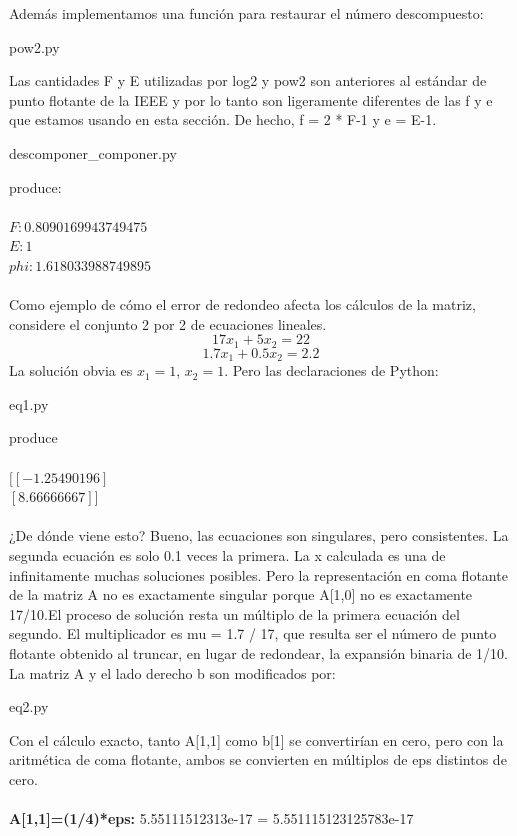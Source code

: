 \documentclass[12pt]{article}
\begin{document}
Adem\'as implementamos una funci\'on para restaurar el n\'umero descompuesto:
\begin{center}

{pow2.py}
\end{center}
Las cantidades F y E utilizadas por log2 y pow2 son anteriores al estándar de punto flotante de la IEEE y por lo tanto son ligeramente diferentes de las f y e que estamos usando en esta
sección. De hecho, f = 2 * F-1 y e = E-1.
\begin{center}

{descomponer_componer.py}
\end{center}
produce:\\\\
$F: 0.8090169943749475$\\
$E: 1$\\
$phi: 1.618033988749895$\\\\
Como ejemplo de cómo el error de redondeo afecta los cálculos de la matriz, considere el
conjunto 2 por 2 de ecuaciones lineales.
$$17x_1+5x_2=22$$
$$1.7x_1+0.5x_2=2.2$$
La solución obvia es $x_1 = 1$, $x_2 = 1$. Pero las declaraciones de Python:
\begin{center}

{eq1.py}
\end{center}
produce\\\\
$[[-1.25490196]$\\
$[8.66666667]]$\\\\
¿De dónde viene esto? Bueno, las ecuaciones son singulares, pero consistentes. La
segunda ecuación es solo 0.1 veces la primera. La x calculada es una de infinitamente
muchas soluciones posibles. Pero la representación en coma flotante de la matriz A no es
exactamente singular porque A[1,0] no es exactamente 17/10.El proceso de solución resta un múltiplo de la primera ecuación del segundo. El multiplicador
es mu = 1.7 / 17, que resulta ser el número de punto flotante obtenido al truncar, en lugar de
redondear, la expansión binaria de 1/10. La matriz A y el lado derecho b son modificados por:
\begin{center}

{eq2.py}
\end{center}
Con el cálculo exacto, tanto A[1,1] como b[1] se convertirían en cero, pero con la aritmética
de coma flotante, ambos se convierten en múltiplos de eps distintos de cero.\\\\
\textbf{A[1,1]=(1/4)*eps:} 5.55111512313e-17 = 5.551115123125783e-17\\\\
\end{document}
